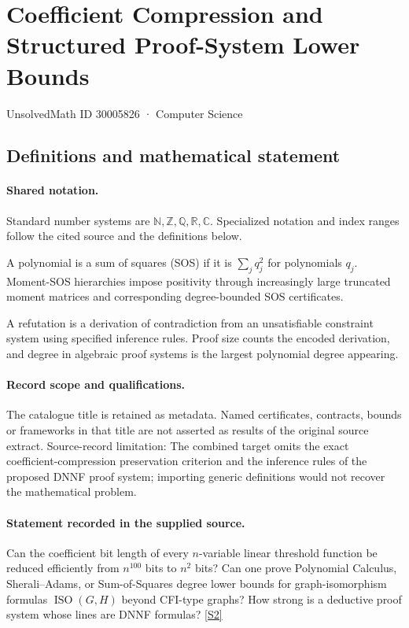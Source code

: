\documentclass[11pt]{article}
\newcommand{\sref}[2]{\hyperlink{source:#1:#2}{[S#2]}}
\begin{document}
\setcounter{section}{30005825}
\section{Coefficient Compression and Structured Proof-System Lower Bounds}\label{30005826}
{\small\sffamily UnsolvedMath ID 30005826 · Computer Science}
\subsection{Definitions and mathematical statement}

\paragraph{Shared notation.}Standard number systems are $\mathbb N,\mathbb Z,\mathbb Q,\mathbb R,\mathbb C$. Specialized notation and index ranges follow the cited source and the definitions below.


A polynomial is a sum of squares (SOS) if it is $\sum_j q_j^2$ for polynomials $q_j$. Moment-SOS hierarchies impose positivity through increasingly large truncated moment matrices and corresponding degree-bounded SOS certificates.

A refutation is a derivation of contradiction from an unsatisfiable constraint system using specified inference rules. Proof size counts the encoded derivation, and degree in algebraic proof systems is the largest polynomial degree appearing.
\paragraph{Record scope and qualifications.}
The catalogue title is retained as metadata. Named certificates, contracts, bounds or frameworks in that title are not asserted as results of the original source extract.
Source-record limitation: The combined target omits the exact coefficient-compression preservation criterion and the inference rules of the proposed DNNF proof system; importing generic definitions would not recover the mathematical problem.
\paragraph{Statement recorded in the supplied source.}
Can the coefficient bit length of every $n$-variable linear threshold function be reduced efficiently from $n^{100}$ bits to $n^2$ bits? Can one prove Polynomial Calculus, Sherali–Adams, or Sum-of-Squares degree lower bounds for graph-isomorphism formulas $\operatorname{ISO}(G,H)$ beyond CFI-type graphs? How strong is a deductive proof system whose lines are DNNF formulas? \sref{30005826}{2}
\end{document}
